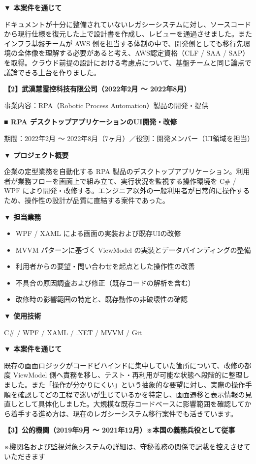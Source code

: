 \documentclass[paper=a4paper,fontsize=10pt,head_space=18mm,foot_space=15mm,gutter=15mm,fore_edge=15mm,baselineskip=16pt]{jlreq}
\newcommand{\project}[1]{%
  \par\vspace{6pt}%
  {\large\bfseries #1}\par\vspace{2pt}%
}
\begin{document}
\textbf{▼ 本案件を通じて}\par
ドキュメントが十分に整備されていないレガシーシステムに対し、ソースコードから現行仕様を復元した上で設計書を作成し、レビューを通過させました。またインフラ基盤チームが AWS 側を担当する体制の中で、開発側としても移行先環境の全体像を理解する必要があると考え、AWS認定資格（CLF / SAA / SAP）を取得。クラウド前提の設計における考慮点について、基盤チームと同じ論点で議論できる土台を作りました。

\project{【2】武漢慧霊控科技有限公司（2022年2月 〜 2022年8月）}
事業内容：RPA（Robotic Process Automation）製品の開発・提供

\project{■ RPA デスクトップアプリケーションのUI開発・改修}
期間：2022年2月 〜 2022年8月（7ヶ月）／役割：開発メンバー（UI領域を担当）

\textbf{▼ プロジェクト概要}\par
企業の定型業務を自動化する RPA 製品のデスクトップアプリケーション。利用者が業務フローを画面上で組み立て、実行状況を監視する操作環境を C\# / WPF により開発・改修する。エンジニア以外の一般利用者が日常的に操作するため、操作性の設計が品質に直結する案件であった。

\textbf{▼ 担当業務}
\begin{itemize}
  \item WPF / XAML による画面の実装および既存UIの改修
  \item MVVM パターンに基づく ViewModel の実装とデータバインディングの整備
  \item 利用者からの要望・問い合わせを起点とした操作性の改善
  \item 不具合の原因調査および修正（既存コードの解析を含む）
  \item 改修時の影響範囲の特定と、既存動作の非破壊性の確認
\end{itemize}

\textbf{▼ 使用技術}\par
C\# / WPF / XAML / .NET / MVVM / Git

\textbf{▼ 本案件を通じて}\par
既存の画面ロジックがコードビハインドに集中していた箇所について、改修の都度 ViewModel 側へ責務を移し、テスト・再利用が可能な状態へ段階的に整理しました。また「操作が分かりにくい」という抽象的な要望に対し、実際の操作手順を確認してどの工程で迷いが生じているかを特定し、画面遷移と表示情報の見直しとして具体化しました。大規模な既存コードベースに影響範囲を確認してから着手する進め方は、現在のレガシーシステム移行案件でも活きています。

\project{【3】公的機関（2019年9月 〜 2021年12月）※本国の義務兵役として従事}
※機関名および監視対象システムの詳細は、守秘義務の関係で記載を控えさせていただきます
\end{document}
